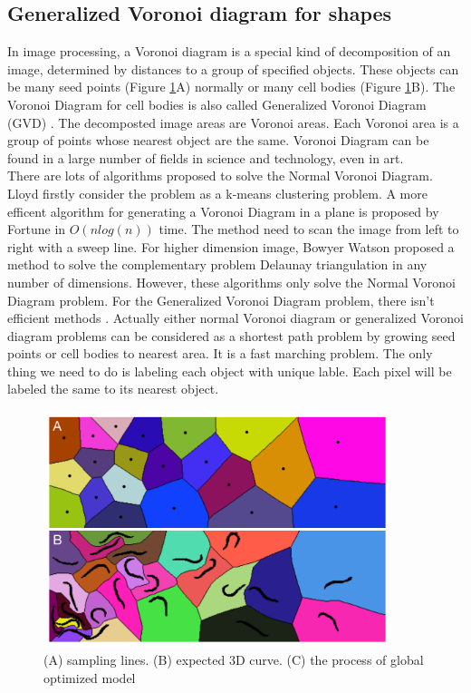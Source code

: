 \subsection{Generalized Voronoi diagram for shapes} \label{subsec:gvd}
In image processing, a Voronoi diagram \cite{aurenhammer1991Voronoi} is a special kind of decomposition of an image, determined by distances to a group of specified objects. These objects can be many seed points (Figure \ref{fig:fm-Voronoi}A) normally or many cell bodies (Figure \ref{fig:fm-Voronoi}B). The Voronoi Diagram for cell bodies is also called Generalized Voronoi Diagram (GVD) \cite{nath2007accurate}. The decomposted image areas are Voronoi areas. Each Voronoi area is a group of points whose nearest object are the same. Voronoi Diagram can be found in a large number of fields in science and technology, even in art.\\
There are lots of algorithms proposed to solve the Normal Voronoi Diagram. Lloyd \cite{lloyd1977triangulations} firstly consider the problem as a k-means clustering problem. A more efficent algorithm for generating a Voronoi Diagram in a plane is proposed by Fortune \cite{fortune1987sweepline} in $O(nlog(n))$ time. The method need to scan the image from left to right with a sweep line. For higher dimension image, Bowyer Watson \cite{rebay1993efficient} proposed a method to solve the complementary problem Delaunay triangulation in any number of dimensions. However, these algorithms only solve the Normal Voronoi Diagram problem. For the Generalized Voronoi Diagram problem, there isn't efficient methods \cite{hoff1999fast, takahashi1989motion, nath2007accurate}. Actually either normal Voronoi diagram or generalized Voronoi diagram problems can be considered as a shortest path problem by growing seed points or cell bodies to nearest area. It is a fast marching problem. The only thing we need to do is labeling each object with unique lable. Each pixel will be labeled the same to its nearest object.

\begin{figure}[htb]
\begin{center}
\includegraphics[width=4in]{images/fm_Voronoi}
\caption[Normal Voronoi diagram and generalized Voronoi diagram]{(A) sampling lines. (B) expected 3D curve. (C) the process of global optimized model}
\label{fig:fm-Voronoi}
\end{center}
\end{figure}
